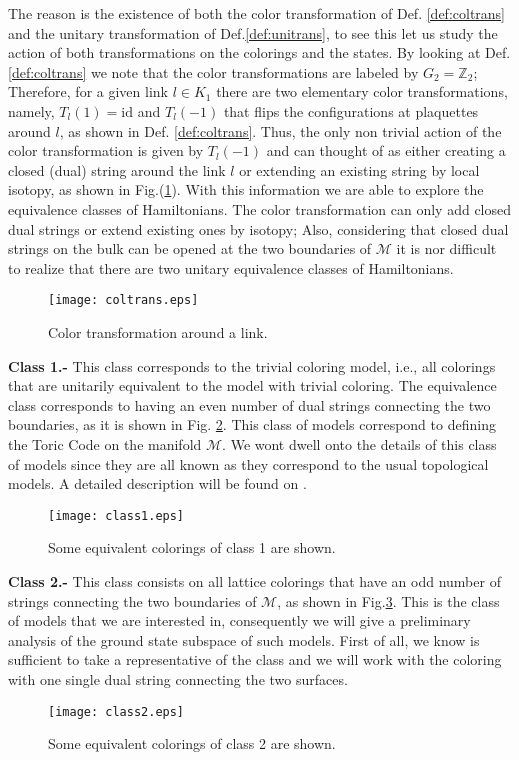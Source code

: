 \documentclass[titlepage,11pt]{article}
\theoremstyle{plain}%
\theoremstyle{definition}
\theoremstyle{remark}
\begin{document}
The reason is the existence of both the color transformation of Def. \ref{def:coltrans} and the unitary transformation of Def.\ref{def:unitrans}, to see this let us study the action of both transformations on the colorings and the states. By looking at Def.\ref{def:coltrans} we note that the color transformations are labeled by \(G_2= \mathbb{Z}_2\); Therefore, for a given link \(l \in K_1\) there are two elementary color transformations, namely, \(T_l(1)= \text{id}\) and \(T_l(-1)\) that flips the configurations at plaquettes around \(l\), as shown in Def. \ref{def:coltrans}. Thus, the only non trivial action of the color transformation is given by \(T_l(-1)\) and can thought of as either creating a closed (dual) string around the link \(l\) or extending an existing string by local isotopy, as shown in Fig.(\ref{fig:coltrans}).
With this information we are able to explore the equivalence classes of Hamiltonians. The color transformation can only add closed dual strings or extend existing ones by isotopy; Also, considering that closed dual strings on the bulk can be opened at the two boundaries of \(\mathcal{M}\) it is nor difficult to realize that there are two unitary equivalence classes of Hamiltonians.

\begin{figure}[h!]
\centering
\texttt{[image: coltrans.eps]}
\caption{\label{fig:coltrans}Color transformation around a link.}
\end{figure}

\textbf{Class 1.-} This class corresponds to the trivial coloring model, i.e., all colorings that are unitarily equivalent to the model with trivial coloring. The equivalence class corresponds to having an even number of dual strings connecting the two boundaries, as it is shown in Fig. \ref{fig:class1}. This class of models correspond to defining the Toric Code on the manifold \(\mathcal{M}\). We wont dwell onto the details of this class of models since they are all known as they correspond to the usual topological models. A detailed description will be found on \cite{pablo}.
\begin{figure}[h!]
\centering
\texttt{[image: class1.eps]}
\caption{\label{fig:class1}Some equivalent colorings of class 1 are shown.}
\end{figure}

\textbf{Class 2.-} This class consists on all lattice colorings that have an odd number of strings connecting the two boundaries of \(\mathcal{M}\), as shown in Fig.\ref{fig:class2}. This is the class of models that we are interested in, consequently we will give a preliminary analysis of the ground state subspace of such models. First of all, we know is sufficient to take a representative of the class and we will work with the coloring with one single dual string connecting the two surfaces.
\begin{figure}[h!]
\centering
\texttt{[image: class2.eps]}
\caption{\label{fig:class2}Some equivalent colorings of class 2 are shown.}
\end{figure}
\end{document}
